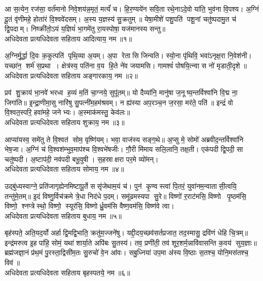 

आ स॒त्येन॒ रज॑सा॒ वर्त॑मानो निवे॒शय॑न्न॒मृतं॒ मर्त्यं॑ च। हि॒र॒ण्यये॑न सवि॒ता रथे॒नाऽदे॒वो या॑ति॒ भुव॑ना वि॒पश्य\sn{}। अ॒ग्निं दू॒तं वृ॑णीमहे॒ होता॑रं वि॒श्ववे॑दसम्। अ॒स्य य॒ज्ञस्य॑ सु॒क्रतुम्॥ येषा॒मीशे॑ पशु॒पति॑ पशू॒नां चतु॑ष्पदामु॒त च॑ द्वि॒पदाम्। निष्क्री॑तो॒ऽयं य॒ज्ञियं॑ भा॒गमे॑तु रा॒यस्पोषा॒ यज॑मानस्य सन्तु॥ \\
अधिदेवता प्रत्यधिदेवता सहिताय आदित्याय॒ नम॥१॥ 

अ॒ग्निर्मू॒र्द्धा दि॒वः क॒कुत्पति॑ पृथि॒व्या अ॒यम्। अ॒पा रेतासि जिन्वति। स्यो॒ना पृ॑थिवि॒ भवा॑ऽनृक्ष॒रा नि॒वेश॑नी। यच्छा॑न॒ शर्म॑ स॒प्रथा। क्षेत्र॑स्य॒ पति॑ना व॒य हि॒ते ने॑व जयामसि। गामश्वं॑ पोषयि॒त्न्वा स नो॑ मृडाती॒दृशे॥ \\
अधिदेवता प्रत्यधिदेवता सहिताय अङ्गारकाय॒ नम॥२॥ 

प्रव॑ शु॒क्राय॑ भा॒नवे॑ भरध्व ह॒व्यं म॒तिं चा॒ग्नये॒ सुपू॑तम्॥ यो दैव्या॑नि॒ मानु॑षा ज॒नूष्य॒न्तर्विश्वा॑नि वि॒द्म ना॒ जिगा॑ति॥ इ॒न्द्रा॒णीमा॒सु नारि॑षु सु॒पत्नी॑म॒हम॑श्रवम्। न ह्य॑स्या अप॒रञ्च॒न ज॒रसा॒ मर॑ते॒ पति॑॥ इन्द्रं॑ वो वि॒श्वत॒स्परि॒ हवा॑महे॒ जनेभ्यः। अ॒स्माक॑मस्तु॒ केव॑लः॥ \\
अधिदेवता प्रत्यधिदेवता सहिताय शुक्राय॒ नम॥३॥ 

आप्या॑यस्व॒ समे॑तु ते वि॒श्वत॑ सोम॒ वृष्णि॑यम्। भवा॒ वाज॑स्य सङ्ग॒थे॥ अ॒प्सु मे॒ सोमो॑ अब्रवीद॒न्तर्विश्वा॑नि भेष॒जा। अ॒ग्निं च॑ वि॒श्वश॑म्भुव॒माप॑श्च वि॒श्वभे॑षजीः। गौ॒री मि॑माय सलि॒लानि॒ तक्ष॒ती। एक॑पदी द्वि॒पदी॒ सा चतु॑ष्पदी। अ॒ष्टाप॑दी॒ नव॑पदी बभू॒वुषी। स॒हस्राक्षरा पर॒मे व्यो॑मन्। \\
अधिदेवता प्रत्यधिदेवता सहिताय सोमाय॒ नम॥४॥ 

उद्बु॑ध्यस्वाग्ने॒ प्रति॑जागृह्येनमिष्टापू॒र्ते ससृ॑जेथाम॒यं च॑। पुन॑ कृ॒ण्वस्त्वा॑ पि॒तरं॒ युवा॑नम॒न्वातासी॒त्वयि॒ तन्तु॑मे॒तम्॥ इ॒दं विष्णु॒र्विच॑क्रमे त्रे॒धा निद॑धे प॒दम्। समू॑ढमस्यपा सु॒रे॥ विष्णो॑ र॒राट॑मसि॒ विष्णो पृ॒ष्ठम॑सि॒ विष्णो॒ श्नप्त्रेस्थो॒ विष्णो॒ स्यूर॑सि॒ विष्णोर्ध्रु॒वम॑सि वैष्ण॒वम॑सि॒ विष्ण॑वे त्वा। \\
अधिदेवता प्रत्यधिदेवता सहिताय बुधाय॒ नम॥५॥ 

बृह॑स्पते॒ अति॒यद॒र्यो अर्हाद्वि॒मद्वि॒भाति॒ क्रतु॑म॒ज्जने॑षु। यद्दी॒दय॒च्छव॑सर्त\-प्रजात॒ तद॒स्मासु॒ द्रवि॑णं धेहि चि॒त्रम्॥ इन्द्र॑मरुत्व इ॒ह पा॑हि॒ सोमं॒ यथा॑ शार्या॒ते अपि॑बः सु॒तस्य॑। तव॒ प्रणी॑ती॒ तव॑ शूर॒शर्म॒न्नावि॑वासन्ति क॒वय॑ सुय॒ज्ञाः॥ ब्रह्म॑जज्ञा॒नं प्र॑थ॒मं पु॒रस्ता॒द्विसी॑म॒तः सु॒रुचो॑ वे॒न आ॑वः। सबु॒ध्निया॑ उप॒मा अ॑स्य वि॒ष्ठाः स॒तश्च॒ योनि॒मस॑तश्च॒ विव॑॥\\
अधिदेवता प्रत्यधिदेवता सहिताय बृहस्पतये॒ नम॥६॥ 

